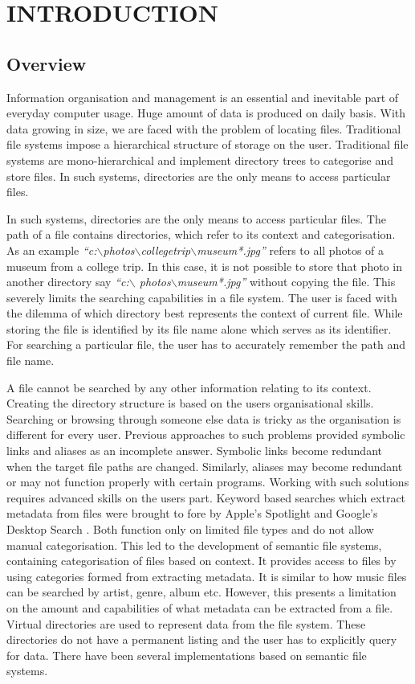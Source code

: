 \chapter{INTRODUCTION}
\section{Overview}

Information organisation and management is an essential and inevitable part of everyday computer usage. Huge amount of data is produced on daily basis. With data growing in size, we are faced with the problem of locating files. Traditional file systems impose a  hierarchical structure of storage on the user. Traditional file systems are mono-hierarchical and implement directory trees to categorise and store files. In such systems, directories are the only means to access particular files.

In such systems, directories are the only means to access particular files. The path of a file contains directories, which refer to its context and categorisation. As an example \textit{``c:$\backslash$photos$\backslash$collegetrip$\backslash$museum*.jpg''} refers to all photos of a museum from a college trip. In this case, it is not possible to store that photo in another directory say \textit{``c:$\backslash$ photos$\backslash$museum*.jpg''} without copying the file. This severely limits the searching capabilities in a file system. The user is faced with the dilemma of which directory best represents the context of current file. While storing the file is identified by its file name alone which serves as its identifier. For searching a particular file, the user has to accurately remember the path and file name.

A file cannot be searched by any other information relating to its context. Creating the directory structure is based on the users organisational skills. Searching or browsing through someone else data is tricky as the organisation is different for every user. Previous approaches to such problems provided symbolic links and aliases as an incomplete answer. Symbolic links become redundant when the target file paths are changed. Similarly, aliases may become redundant or may not function properly with certain programs. Working with such solutions requires advanced skills on the users part. Keyword based searches which extract metadata from files were brought to fore by Apple's Spotlight\cite{SPOTLIGHT} and Google's Desktop Search\cite{GOOGLEDESKTOP} . Both function only on limited file types and do not allow manual categorisation. This led to the development of semantic file systems, containing categorisation of files based on context. It provides access to files by using categories formed from extracting metadata. It is similar to how music files can be searched by artist, genre, album etc. However, this presents a limitation on the amount and capabilities of what metadata can be extracted from a file. Virtual directories are used to represent data from the file system. These directories do not have a permanent listing and the user has to explicitly query for data. There have been several implementations based on semantic file systems.


